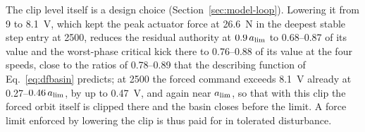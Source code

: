 The clip level itself is a design choice (Section~\ref{sec:model-loop}). Lowering it from 9 to \SI{8.1}{\volt}, which kept the peak actuator force at \SI{26.6}{\newton} in the deepest stable step entry at \SI{2500}{\rpm}, reduces the residual authority at $0.9\,a_{\lim}$ to 0.68--0.87 of its value and the worst-phase critical kick there to 0.76--0.88 of its value at the four speeds, close to the ratios of 0.78--0.89 that the describing function of Eq.~\eqref{eq:dfbasin} predicts; at \SI{2500}{\rpm} the forced command exceeds \SI{8.1}{\volt} already at 0.27--$0.46\,a_{\lim}$, by up to \SI{0.47}{\volt}, and again near $a_{\lim}$, so that with this clip the forced orbit itself is clipped there and the basin closes before the limit. A force limit enforced by lowering the clip is thus paid for in tolerated disturbance.
